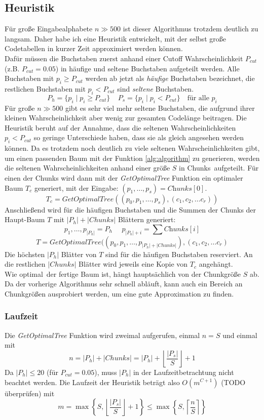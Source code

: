 \documentclass[a4paper,10pt,ngerman]{scrartcl}
\begin{document}
    \subsection{Heuristik}
    Für große Eingabealphabete $n \gg 500$ ist dieser Algorithmus trotzdem deutlich zu langsam.
    Daher habe ich eine Heuristik entwickelt, mit der selbst große Codetabellen in kurzer Zeit approximiert werden können. \\
    Dafür müssen die Buchstaben zuerst anhand einer Cutoff Wahrscheinlichkeit $P_{cut}$ (z.B. $P_{cut} = 0.05$) in häufige und seltene Buchstaben aufgeteilt werden.
    Alle Buchstaben mit $p_i \ge P_{cut}$ werden ab jetzt als \textit{häufige} Buchstaben bezeichnet, die restlichen Buchstaben mit $p_i < P_{cut}$ sind \textit{seltene} Buchstaben.
    \[P_{h} = \{p_i \mid p_i \ge P_{cut}\}~~~~~P_s = \{p_i \mid p_i < P_{cut}\} \text{~~~für alle $p_i$}\]
    Für große $n \gg 500$ gibt es sehr viel mehr seltene Buchstaben, die aufgrund ihrer kleinen Wahrscheinlichkeit aber wenig zur gesamten Codelänge beitragen.
    Die Heuristik beruht auf der Annahme, dass die seltenen Wahrscheinlichkeiten $p_i < P_{cut}$ so geringe Unterschiede haben, dass sie als gleich angesehen werden können.
    Da es trotzdem noch deutlich zu viele seltenen Wahrscheinlichkeiten gibt, um einen passenden Baum mit der Funktion \ref{alg:algorithm} zu generieren, werden die seltenen Wahrscheinlichkeiten anhand einer größe $S$ in \glqq Chunks\grqq~aufgeteilt.
    Für einen der Chunks wird dann mit der \textit{GetOptimalTree} Funktion ein optimaler Baum $T_c$ generiert, mit der Eingabe: $(p_1, \dots, p_s) = \textit{Chunks}[0]$.
    \[T_c = \textit{GetOptimalTree}((p_0, p_1, \dots, p_s), (c_1, c_2, \dots c_r))\]
    Anschließend wird für die häufigen Buchstaben und die Summen der Chunks der Haupt-Baum $T$ mit $|P_h| + |Chunks|$ Blättern generiert:
    \[p_1, \dots, p_{|P_h|} = P_h~~~~~~p_{|P_h| + i} = \sum \textit{Chunks}[i]\]
    \[T = \textit{GetOptimalTree}((p_0, p_1, \dots, p_{|P_h| + |Chunks|}), (c_1, c_2, \dots c_r)\]
    Die höchsten $|P_h|$ Blätter von $T$ sind für die häufigen Buchstaben \glqq reserviert\grqq.
    An die restlichen $|Chunks|$ Blätter wird jeweils eine Kopie von $T_c$ angehängt. \\
    Wie \glqq optimal\grqq~der fertige Baum ist, hängt hauptsächlich von der Chunkgröße $S$ ab.
    Da der vorherige Algorithmus sehr schnell abläuft, kann auch ein Bereich an Chunkgrößen ausprobiert werden, um eine gute Approximation zu finden.

    \subsubsection{Laufzeit}
    Die \textit{GetOptimalTree} Funktion wird zweimal aufgerufen, einmal $n = S$ und einmal mit
    \[n = |P_h| + |Chunks| = |P_h| +  \left\lfloor   \frac {|P_s|} {S}  \right\rfloor + 1\]
    Da $|P_h| \le 20$ (für $P_{cut} = 0.05$), muss $|P_h|$ in der Laufzeitbetrachtung nicht beachtet werden.
    Die Laufzeit der Heuristik beträgt also $O(m^{C+1})$ (TODO überprüfen) mit
    \[m = \max \left\{ S, \left\lfloor   \frac {|P_s|} {S}  \right\rfloor + 1 \right\} \le \max \left\{S, \left\lceil \frac n S \right\rceil \right\}\]
\end{document}
